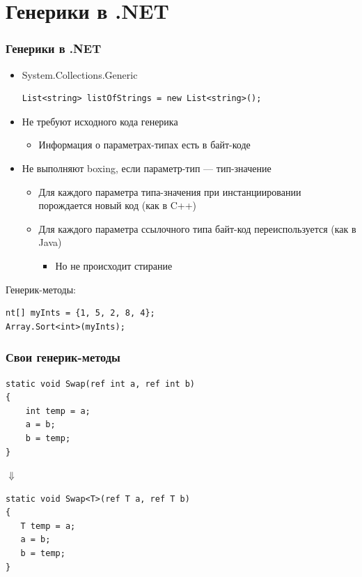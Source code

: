 \documentclass[xetex,mathserif,serif]{beamer}
\begin{document}
	\section{Генерики в .NET}

	\begin{frame}[fragile]
		\frametitle{Генерики в .NET}
		\begin{itemize}
			\item System.Collections.Generic
			\begin{verbatim}
List<string> listOfStrings = new List<string>();
			\end{verbatim}
			\item Не требуют исходного кода генерика
			\begin{itemize}
				\item Информация о параметрах-типах есть в байт-коде
			\end{itemize}
			\item Не выполняют boxing, если параметр-тип --- тип-значение
			\begin{itemize}
				\item Для каждого параметра типа-значения при инстанциировании порождается новый код (как в C++)
				\item Для каждого параметра ссылочного типа байт-код переиспользуется (как в Java)
				\begin{itemize}
					\item Но не происходит стирание
				\end{itemize}
			\end{itemize}
		\end{itemize}

		Генерик-методы:
		\begin{verbatim}
nt[] myInts = {1, 5, 2, 8, 4};
Array.Sort<int>(myInts);
		\end{verbatim}
	\end{frame}

	\begin{frame}[fragile]
		\frametitle{Свои генерик-методы}
		\begin{verbatim}
static void Swap(ref int a, ref int b)
{
    int temp = a;
    a = b;
    b = temp;
}
		\end{verbatim}
		\hspace{2cm} $\Downarrow$
		\begin{verbatim}
static void Swap<T>(ref T a, ref T b)
{
   T temp = a;
   a = b;
   b = temp;
}
		\end{verbatim}
	\end{frame}
\end{document}
